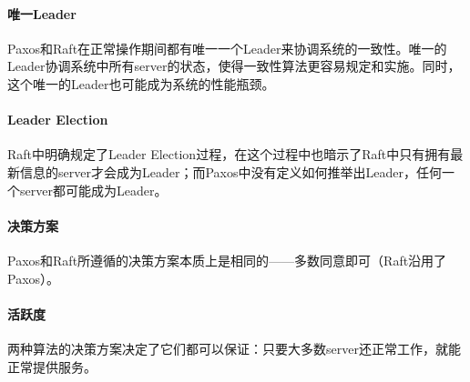 \documentclass[UTF8]{article}
\begin{document}
\paragraph{唯一Leader} Paxos和Raft在正常操作期间都有唯一一个Leader来协调系统的一致性。唯一的Leader协调系统中所有server的状态，使得一致性算法更容易规定和实施。同时，这个唯一的Leader也可能成为系统的性能瓶颈。

\paragraph{Leader Election}Raft中明确规定了Leader Election过程，在这个过程中也暗示了Raft中只有拥有最新信息的server才会成为Leader；而Paxos中没有定义如何推举出Leader，任何一个server都可能成为Leader。

\paragraph{决策方案} Paxos和Raft所遵循的决策方案本质上是相同的——多数同意即可（Raft沿用了Paxos）。

\paragraph{活跃度} 两种算法的决策方案决定了它们都可以保证：只要大多数server还正常工作，就能正常提供服务。

    
\end{document}
